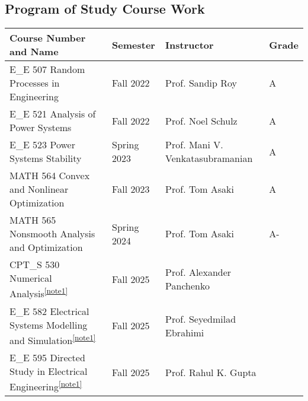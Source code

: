 \subsection{Program of Study Course Work}
\begin{table}[h!]
\centering
\setlength{\tabcolsep}{4pt}
\label{tab:my-table}
\begin{adjustbox}{width=1\textwidth,center=\textwidth}
\begin{tabular}{@{}l|l|l|l@{}}
\toprule
Course Number and Name                          & Semester       & Instructor                     & Grade \\ \midrule

E\_E 507 Random Processes in Engineering        & Fall 2022      & Prof. Sandip Roy               & A    \\
E\_E 521 Analysis of Power Systems              & Fall 2022      & Prof. Noel Schulz              & A    \\
E\_E 523 Power Systems Stability                & Spring 2023    & Prof. Mani V. Venkatasubramanian & A   \\
MATH 564 Convex and Nonlinear Optimization      & Fall 2023      & Prof. Tom Asaki                & A    \\
MATH 565 Nonsmooth Analysis and Optimization    & Spring 2024    & Prof. Tom Asaki                & A-   \\
CPT\_S 530 Numerical Analysis\textsuperscript{\ref{note1}} & Fall 2025 & Prof. Alexander Panchenko & \\
E\_E 582 Electrical Systems Modelling and Simulation\textsuperscript{\ref{note1}} & Fall 2025 & Prof. Seyedmilad Ebrahimi & \\

E\_E 595 Directed Study in Electrical Engineering\textsuperscript{\ref{note1}} & Fall 2025 & Prof. Rahul K. Gupta & \\ \bottomrule
\end{tabular}
\end{adjustbox}


\end{table}

